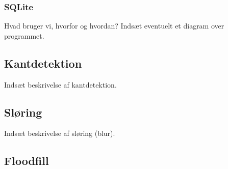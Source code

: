 {\subsubsection*{SQLite}


Hvad bruger vi, hvorfor og hvordan? Indsæt eventuelt et diagram over
programmet.

\subsection{Kantdetektion}
Indsæt beskrivelse af kantdetektion.

\subsection{Sløring}
Indsæt beskrivelse af sløring (blur).

\subsection{Floodfill}


}

